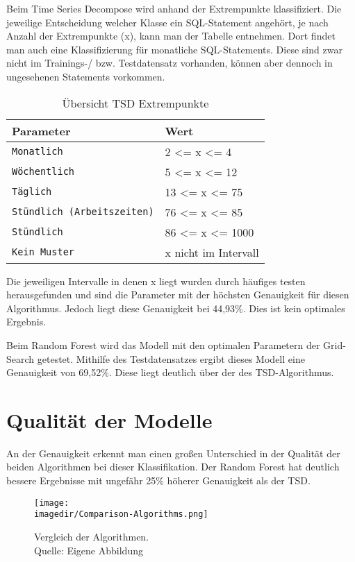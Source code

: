 Beim Time Series Decompose wird anhand der Extrempunkte klassifiziert. Die jeweilige Entscheidung welcher Klasse ein SQL-Statement angehört, je nach Anzahl der Extrempunkte (x), kann man der Tabelle entnehmen. Dort findet man auch eine Klassifizierung für monatliche SQL-Statements. Diese sind zwar nicht im Trainings-/ bzw. Testdatensatz vorhanden, können aber dennoch in ungesehenen Statements vorkommen.

\begin{table}[H]
	\centering
	\begin{tabular}{lp{10cm}}
		\textbf{Parameter} & \textbf{Wert}\\\toprule
		\texttt{Monatlich} & 2 \textless{}= x \textless{}= 4 \\\midrule
		\texttt{Wöchentlich} & 5 \textless{}= x \textless{}= 12 \\\midrule
		\texttt{Täglich} & 13 \textless{}= x \textless{}= 75\\\midrule
		\texttt{Stündlich (Arbeitszeiten)} & 76 \textless{}= x \textless{}= 85\\\midrule
		\texttt{Stündlich} & 86 \textless{}= x \textless{}= 1000\\\midrule
		\texttt{Kein Muster} & x nicht im Intervall
		\\\bottomrule
	\end{tabular}
	\caption{\label{tab:dateien}Übersicht TSD Extrempunkte}
\end{table}

Die jeweiligen Intervalle in denen x liegt wurden durch häufiges testen herausgefunden und sind die Parameter mit der höchsten Genauigkeit für diesen Algorithmus. Jedoch liegt diese Genauigkeit bei 44,93\%. Dies ist kein optimales Ergebnis.

Beim Random Forest wird das Modell mit den optimalen Parametern der Grid-Search getestet. Mithilfe des Testdatensatzes ergibt dieses Modell eine Genauigkeit von 69,52\%. Diese liegt deutlich über der des TSD-Algorithmus.

\section{Qualität der Modelle}

An der Genauigkeit erkennt man einen großen Unterschied in der Qualität der beiden Algorithmen bei dieser Klassifikation. Der Random Forest hat deutlich bessere Ergebnisse mit ungefähr 25\% höherer Genauigkeit als der TSD.

\begin{figure}[H]
	
	\centering
	\texttt{[image: \\imagedir/Comparison-Algorithms.png]}
	\captionsetup{format=hang}
	\caption[Vergleich der Algorithmen]{\label{fig:test}Vergleich der Algorithmen. \\Quelle: Eigene Abbildung}
	
\end{figure}

